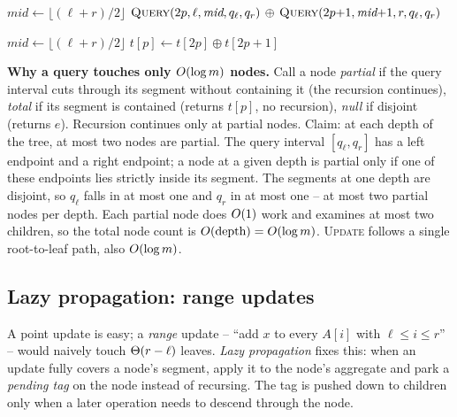 \begin{algorithm}[H]
\DontPrintSemicolon
\caption{\textsc{Query}$(p,\ell,r,\, q_\ell,q_r)$ -- combine $A[q_\ell\ldots q_r]$}
$\textit{mid} \gets \lfloor(\ell+r)/2\rfloor$\;
\Return $\textsc{Query}(2p,\ell,\textit{mid},q_\ell,q_r) \,\oplus\, \textsc{Query}(2p{+}1,\textit{mid}{+}1,r,q_\ell,q_r)$\;
\end{algorithm}

\begin{algorithm}[H]
\DontPrintSemicolon
\caption{\textsc{Update}$(p,\ell,r,\, i,\, x)$ -- set $A[i]\gets x$}
$\textit{mid} \gets \lfloor(\ell+r)/2\rfloor$\;
$t[p] \gets t[2p] \oplus t[2p{+}1]$\;
\end{algorithm}

\begin{whybox}
\textbf{Why a query touches only $O(\log m)$ nodes.} Call a node \emph{partial} if the
query interval cuts through its segment without containing it (the recursion continues),
\emph{total} if its segment is contained (returns $t[p]$, no recursion), \emph{null} if
disjoint (returns $e$). Recursion continues only at partial nodes. Claim: at each depth of
the tree, at most two nodes are partial. The query interval $[q_\ell,q_r]$ has a left endpoint
and a right endpoint; a node at a given depth is partial only if one of these endpoints lies
strictly inside its segment. The segments at one depth are disjoint, so $q_\ell$ falls in at
most one and $q_r$ in at most one -- at most two partial nodes per depth. Each partial node
does $O(1)$ work and examines at most two children, so the total node count is
$O(\text{depth})=O(\log m)$. \textsc{Update} follows a single root-to-leaf path, also
$O(\log m)$.
\end{whybox}

\subsection{Lazy propagation: range updates}

A point update is easy; a \emph{range} update -- ``add $x$ to every $A[i]$ with
$\ell\le i\le r$'' -- would naively touch $\Theta(r-\ell)$ leaves. \emph{Lazy propagation} fixes
this: when an update fully covers a node's segment, apply it to the node's aggregate and park
a \emph{pending tag} on the node instead of recursing. The tag is pushed down to children
only when a later operation needs to descend through the node.

